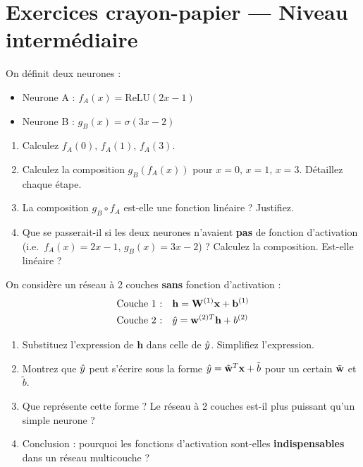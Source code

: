 \section*{Exercices crayon-papier --- Niveau interm\'{e}diaire}


On d\'{e}finit deux neurones :
\begin{itemize}
    \item Neurone A : $f_A(x) = \text{ReLU}(2x - 1)$
    \item Neurone B : $g_B(x) = \sigma(3x - 2)$
\end{itemize}

\begin{enumerate}[label=\alph*)]
    \item Calculez $f_A(0)$, $f_A(1)$, $f_A(3)$.
    \item Calculez la composition $g_B(f_A(x))$ pour $x = 0$, $x = 1$, $x = 3$.
        D\'{e}taillez chaque \'{e}tape.
    \item La composition $g_B \circ f_A$ est-elle une fonction lin\'{e}aire ?
        Justifiez.
    \item Que se passerait-il si les deux neurones n'avaient \textbf{pas}
        de fonction d'activation (i.e.\ $f_A(x) = 2x - 1$, $g_B(x) = 3x - 2$) ?
        Calculez la composition. Est-elle lin\'{e}aire ?
\end{enumerate}


On consid\`{e}re un r\'{e}seau \`{a} 2 couches \textbf{sans} fonction d'activation :
\begin{align*}
    \text{Couche 1 :}\quad & \mathbf{h} = \mathbf{W}^{(1)}\mathbf{x} + \mathbf{b}^{(1)} \\
    \text{Couche 2 :}\quad & \hat{y} = \mathbf{w}^{(2)T}\mathbf{h} + b^{(2)}
\end{align*}

\begin{enumerate}[label=\alph*)]
    \item Substituez l'expression de $\mathbf{h}$ dans celle de $\hat{y}$.
        Simplifiez l'expression.
    \item Montrez que $\hat{y}$ peut s'\'{e}crire sous la forme $\hat{y} = \tilde{\mathbf{w}}^T \mathbf{x} + \tilde{b}$
        pour un certain $\tilde{\mathbf{w}}$ et $\tilde{b}$.
    \item Que repr\'{e}sente cette forme ? Le r\'{e}seau \`{a} 2 couches est-il plus
        puissant qu'un simple neurone ?
    \item Conclusion : pourquoi les fonctions d'activation sont-elles
        \textbf{indispensables} dans un r\'{e}seau multicouche ?
\end{enumerate}


